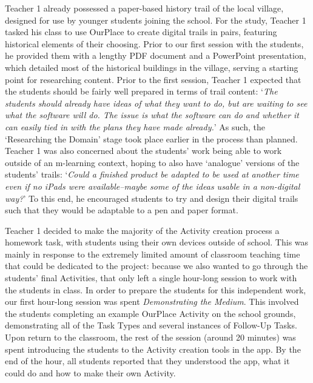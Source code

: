 \documentclass[,hyphens]{sigchi}
\begin{document}
Teacher 1 already possessed a paper-based history trail of the local village, designed for use by younger students joining the school. For the study, Teacher 1 tasked his class to use OurPlace to create digital trails in pairs, featuring historical elements of their choosing. Prior to our first session with the students, he provided them with a lengthy PDF document and a PowerPoint presentation, which detailed most of the historical buildings in the village, serving a starting point for researching content. Prior to the first session, Teacher 1 expected that the students should be fairly well prepared in terms of trail content: `\textit{The students should already have ideas of what they want to do, but are waiting to see what the software will do. The issue is what the software can do and whether it can easily tied in with the plans they have made already.}'  As such, the `Researching the Domain' stage took place earlier in the process than planned. Teacher 1 was also concerned about the students' work being able to work outside of an m-learning context, hoping to also have `analogue' versions of the students' trails: `\textit{Could a finished product be adapted to be used at another time even if no iPads were available--maybe some of the ideas usable in a non-digital way?}' To this end, he encouraged students to try and design their digital trails such that they would be adaptable to a pen and paper format.

Teacher 1 decided to make the majority of the Activity creation process a homework task, with students using their own devices outside of school. This was mainly in response to the extremely limited amount of classroom teaching time that could be dedicated to the project: because we also wanted to go through the students' final Activities, that only left a single hour-long session to work with the students in class. In order to prepare the students for this independent work, our first hour-long session was spent \textit{Demonstrating the Medium}. This involved the students completing an example OurPlace Activity on the school grounds, demonstrating all of the Task Types and several instances of Follow-Up Tasks. Upon return to the classroom, the rest of the session (around 20 minutes) was spent introducing the students to the Activity creation tools in the app. By the end of the hour, all students reported that they understood the app, what it could do and how to make their own Activity.
\end{document}

